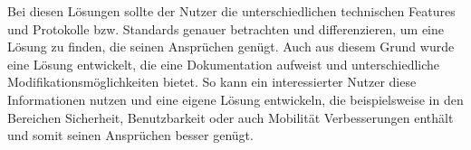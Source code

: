 Bei diesen Lösungen sollte der Nutzer die unterschiedlichen technischen Features und Protokolle bzw. Standards genauer betrachten und differenzieren, um eine Lösung zu finden, die seinen Ansprüchen genügt. 
Auch aus diesem Grund wurde eine Lösung entwickelt, die eine Dokumentation aufweist und unterschiedliche Modifikationsmöglichkeiten bietet. So kann ein interessierter Nutzer diese Informationen nutzen und eine eigene Lösung entwickeln, die beispielsweise in den Bereichen Sicherheit, Benutzbarkeit oder auch Mobilität Verbesserungen enthält und somit seinen Ansprüchen besser genügt. 